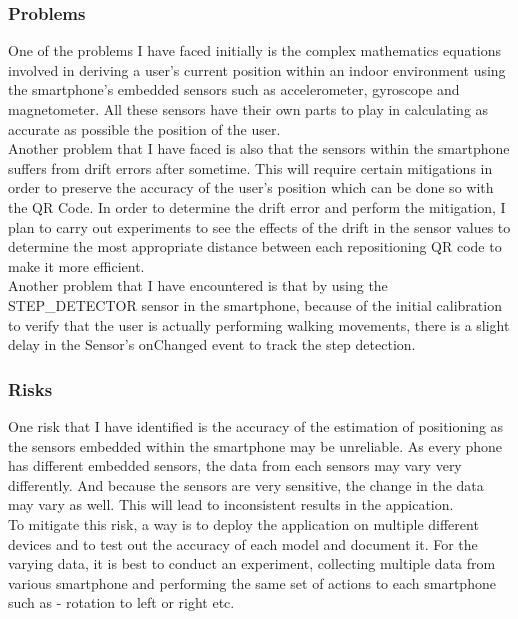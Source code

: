 \documentclass[11pt]{article}
\begin{document}
\subsubsection{Problems}\label{problems}

One of the problems I have faced initially is the complex mathematics equations involved in deriving a user's current position within an indoor environment using the smartphone's embedded sensors such as accelerometer, gyroscope and magnetometer. All these sensors have their own parts to play in calculating as accurate as possible the position of the user.\\

Another problem that I have faced is also that the sensors within the smartphone suffers from drift errors after sometime. This will require certain mitigations in order to preserve the accuracy of the user's position which can be done so with the QR Code. In order to determine the drift error and perform the mitigation, I plan to carry out experiments to see the effects of the drift in the sensor values to determine the most appropriate distance between each repositioning QR code to make it more efficient.\\

Another problem that I have encountered is that by using the STEP_DETECTOR sensor in the smartphone, because of the initial calibration to verify that the user is actually performing walking movements, there is a slight delay in the Sensor's onChanged event to track the step detection.

\subsubsection{Risks}\label{risks}

One risk that I have identified is the accuracy of the estimation of positioning as the sensors embedded within the smartphone may be unreliable. As every phone has different embedded sensors, the data from each sensors may vary very differently. And because the sensors are very sensitive, the change in the data may vary as well. This will lead to inconsistent results in the appication.\\
 
To mitigate this risk, a way is to deploy the application on multiple different devices and to test out the accuracy of each model and document it. For the varying data, it is best to conduct an experiment, collecting multiple data from various smartphone and performing the same set of actions to each smartphone such as - rotation to left or right etc.
\end{document}
